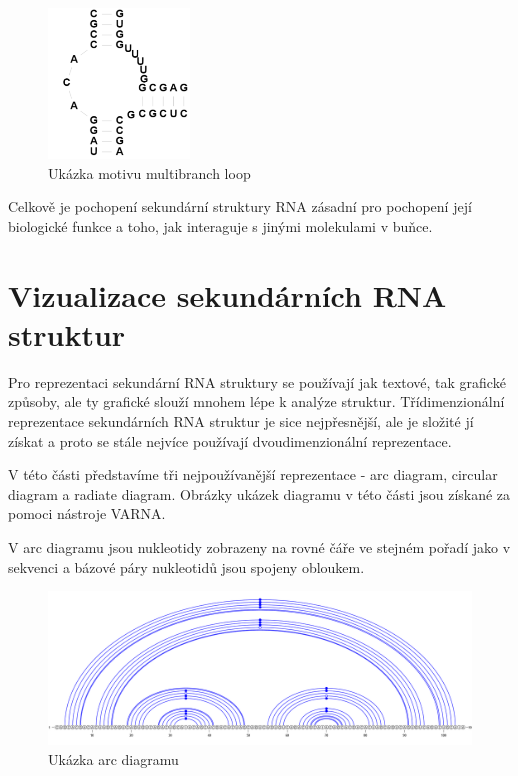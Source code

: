 \begin{figure}[H]
  \centering
  \includegraphics[height=40mm]{../img/kap01/rna/multibranch.png}
  \caption{Ukázka motivu multibranch loop}
\end{figure}

Celkově je pochopení sekundární struktury RNA zásadní pro pochopení její
biologické funkce a toho, jak interaguje s jinými molekulami v buňce.

\section{Vizualizace sekundárních RNA struktur} 

Pro reprezentaci sekundární RNA struktury se používají jak textové, tak
grafické způsoby, ale ty grafické slouží mnohem lépe k analýze struktur.
Třídimenzionální reprezentace sekundárních RNA struktur je sice nejpřesnější,
ale je složité jí získat a proto se stále nejvíce používají dvoudimenzionální
reprezentace. 

V této části představíme tři nejpoužívanější reprezentace - arc diagram,
circular diagram a radiate diagram. Obrázky ukázek diagramu v této části jsou
získané za pomoci nástroje VARNA\cite{Varna}.

V arc diagramu jsou nukleotidy zobrazeny na rovné čáře ve stejném pořadí jako v
sekvenci a bázové páry nukleotidů jsou spojeny obloukem.

\begin{figure}[H]
  \centering
  \includegraphics[width=140mm]{../img/kap01/diagrams/arc.png}
  \caption{Ukázka arc diagramu}
\end{figure}

